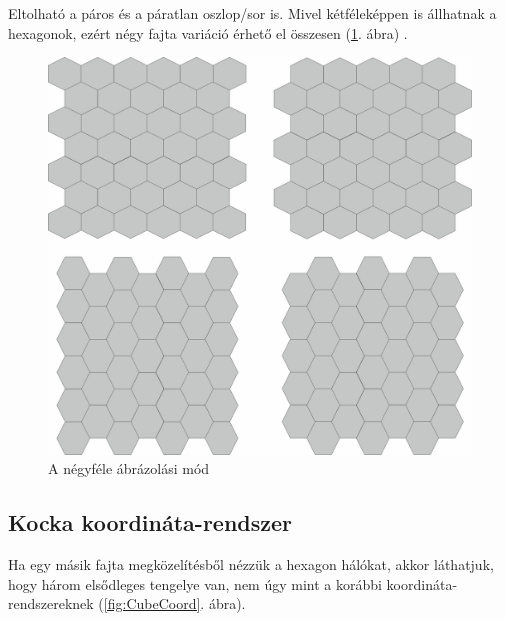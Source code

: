 Eltolható a páros és a páratlan oszlop/sor is. Mivel kétféleképpen is állhatnak a hexagonok, ezért négy fajta variáció érhető el összesen (\ref{fig:OffsetFour}. ábra) \cite{Offset}.

\begin{figure}[h!]
\centering
\includegraphics[scale=0.2]{kepek/OffsetFour.jpg}
\caption{A négyféle ábrázolási mód}
\label{fig:OffsetFour}
\end{figure}

\newpage
\subsection{Kocka koordináta-rendszer}

Ha egy másik fajta megközelítésből nézzük a hexagon hálókat, akkor láthatjuk, hogy három elsődleges tengelye van, nem úgy mint a korábbi koordináta-rendszereknek (\ref{fig:CubeCoord}. ábra).


